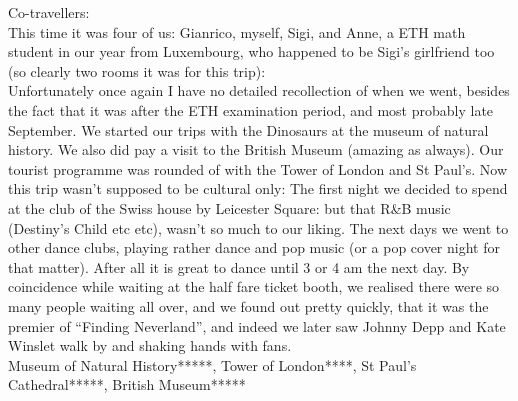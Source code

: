 Co-travellers:\\
This time it was four of us: Gianrico, myself, Sigi, and Anne, a ETH math student in our year from Luxembourg, who happened to be Sigi's girlfriend too (so clearly two rooms it was for this trip):\\

Unfortunately once again I have no detailed recollection of when we went, besides the fact that it was after the ETH examination period, and most probably late September. We started our trips with the Dinosaurs at the museum of natural history. We also did pay a visit to the British Museum (amazing as always). Our tourist programme was rounded of with the Tower of London and St Paul's. Now this trip wasn't supposed to be cultural only: The first night we decided to spend at the club of the Swiss house by Leicester Square: but that R\&B music (Destiny's Child etc etc), wasn't so much to our liking. The next days we went to other dance clubs, playing rather dance and pop music (or a pop cover night for that matter). After all it is great to dance until 3 or 4 am the next day. By coincidence while waiting at the half fare ticket booth, we realised there were so many people waiting all over, and we found out pretty quickly, that it was the premier of ``Finding Neverland'', and indeed we later saw Johnny Depp and Kate Winslet walk by and shaking hands with fans.\\

Museum of Natural History*****, Tower of London****, St Paul's Cathedral*****, British Museum*****
